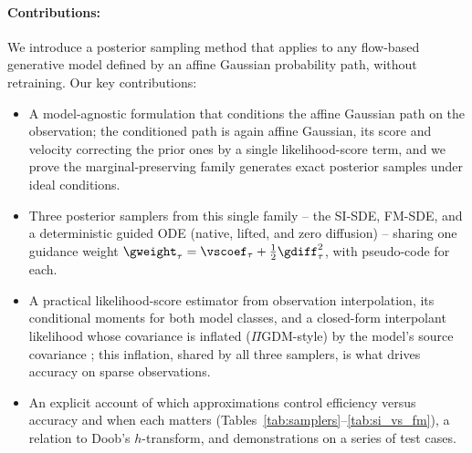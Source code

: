 \paragraph{Contributions:}
We introduce a posterior sampling method that applies to any flow-based generative model defined by an affine Gaussian probability path, without retraining. Our key contributions:
\begin{itemize}
    \item A model-agnostic formulation that conditions the affine Gaussian path on the observation; the conditioned path is again affine Gaussian, its score and velocity correcting the prior ones by a single likelihood-score term, and we prove the marginal-preserving family generates exact posterior samples under ideal conditions.
    \item Three posterior samplers from this single family -- the SI-SDE, FM-SDE, and a deterministic guided ODE (native, lifted, and zero diffusion) -- sharing one guidance weight $\gweight_\tau=\vscoef_\tau+\tfrac12\gdiff_\tau^2$, with pseudo-code for each.
    \item A practical likelihood-score estimator from observation interpolation, its conditional moments for both model classes, and a closed-form interpolant likelihood whose covariance is inflated ($\Pi$GDM-style) by the model's source covariance \cite{chung_diffusion_2023, song_pseudoinverse_2023}; this inflation, shared by all three samplers, is what drives accuracy on sparse observations.
    \item An explicit account of which approximations control efficiency versus accuracy and when each matters (Tables~\ref{tab:samplers}--\ref{tab:si_vs_fm}), a relation to Doob's $h$-transform, and demonstrations on a series of test cases.
\end{itemize}
